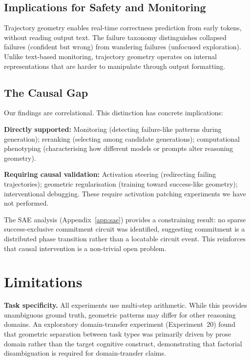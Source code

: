\documentclass[11pt,twocolumn]{article}
\begin{document}
\subsection{Implications for Safety and Monitoring}

Trajectory geometry enables real-time correctness prediction from early tokens, without reading output text. The failure taxonomy distinguishes collapsed failures (confident but wrong) from wandering failures (unfocused exploration). Unlike text-based monitoring, trajectory geometry operates on internal representations that are harder to manipulate through output formatting.

\subsection{The Causal Gap}
\label{sec:causal_gap}

Our findings are correlational. This distinction has concrete implications:

\textbf{Directly supported:} Monitoring (detecting failure-like patterns during generation); reranking (selecting among candidate generations); computational phenotyping (characterising how different models or prompts alter reasoning geometry).

\textbf{Requiring causal validation:} Activation steering (redirecting failing trajectories); geometric regularisation (training toward success-like geometry); interventional debugging. These require activation patching experiments we have not performed.

The SAE analysis (Appendix~\ref{app:sae}) provides a constraining result: no sparse success-exclusive commitment circuit was identified, suggesting commitment is a distributed phase transition rather than a locatable circuit event. This reinforces that causal intervention is a non-trivial open problem.


\section{Limitations}
\label{sec:limitations}

\textbf{Task specificity.} All experiments use multi-step arithmetic. While this provides unambiguous ground truth, geometric patterns may differ for other reasoning domains. An exploratory domain-transfer experiment (Experiment~20) found that geometric separation between task types was primarily driven by prose domain rather than the target cognitive construct, demonstrating that factorial disambiguation is required for domain-transfer claims.
\end{document}
